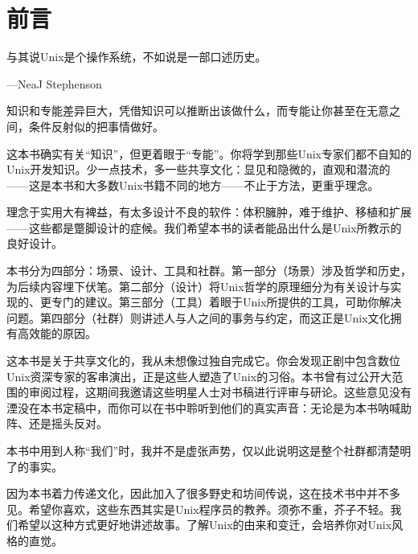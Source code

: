 \documentclass[12pt,oneside]{book}
\begin{document}
\frontmatter   

\author{Eric S. Raymond}
\titleLC

\chapter*{前言}
\begin{common-format}
\begin{flushright}
\begin{notecard}{23em}
与其说Unix是个操作系统，不如说是一部口述历史。

{\hfill —NeaJ Stephenson}
\end{notecard}
\end{flushright}

知识和专能差异巨大，凭借知识可以推断出该做什么，而专能让你甚至在无意之间，条件反射似的把事情做好。

这本书确实有关“知识”，但更着眼于“专能”。你将学到那些Unix专家们都不自知的Unix开发知识。少一点技术，多一些共享文化：显见和隐微的，直观和潜流的——这是本书和大多数Unix书籍不同的地方——不止于方法，更重乎理念。

理念于实用大有裨益，有太多设计不良的软件：体积臃肿，难于维护、移植和扩展——这些都是蹩脚设计的症候。我们希望本书的读者能品出什么是Unix所教示的良好设计。

本书分为四部分：场景、设计、工具和社群。第一部分（场景）涉及哲学和历史，为后续内容埋下伏笔。第二部分（设计）将Unix哲学的原理细分为有关设计与实现的、更专门的建议。第三部分（工具）着眼于Unix所提供的工具，可助你解决问题。第四部分（社群）则讲述人与人之间的事务与约定，而这正是Unix文化拥有高效能的原因。

这本书是关于共享文化的，我从未想像过独自完成它。你会发现正剧中包含数位Unix资深专家的客串演出，正是这些人塑造了Unix的习俗。本书曾有过公开大范围的审阅过程，这期间我邀请这些明星人士对书稿进行评审与研论。这些意见没有湮没在本书定稿中，而你可以在书中聆听到他们的真实声音：无论是为本书呐喊助阵、还是摇头反对。

本书中用到人称“我们”时，我并不是虚张声势，仅以此说明这是整个社群都清楚明了的事实。

因为本书着力传递文化，因此加入了很多野史和坊间传说，这在技术书中并不多见。希望你喜欢，这些东西其实是Unix程序员的教养。须弥不重，芥子不轻。我们希望以这种方式更好地讲述故事。了解Unix的由来和变迁，会培养你对Unix风格的直觉。


\end{common-format}
\end{document}

